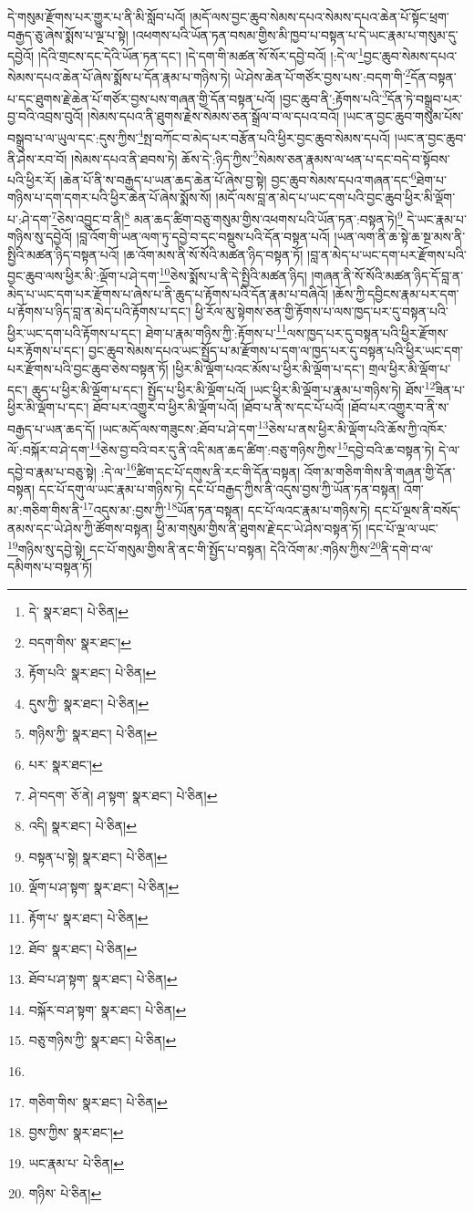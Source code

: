 དེ་གསུམ་རྫོགས་པར་གྱུར་པ་ནི་མི་སློབ་པའོ། །མདོ་ལས་བྱང་ཆུབ་སེམས་དཔའ་སེམས་དཔའ་ཆེན་པོ་སྟོང་ཕྲག་བརྒྱད་ཅུ་ཞེས་སྨོས་པ་ལྔ་པ་སྟེ། །འཕགས་པའི་ཡོན་ཏན་བསམ་གྱིས་མི་ཁྱབ་པ་བསྟན་པ་དེ་ཡང་རྣམ་པ་གསུམ་དུ་དབྱེའོ། །དེའི་གྲངས་དང་དེའི་ཡོན་ཏན་དང་། །དེ་དག་གི་མཚན་སོ་སོར་དབྱེ་བའོ། །:དེ་ལ་\footnote{དེ་  སྣར་ཐང་།  པེ་ཅིན། }བྱང་ཆུབ་སེམས་དཔའ་སེམས་དཔའ་ཆེན་པོ་ཞེས་སྨོས་པ་དོན་རྣམ་པ་གཉིས་ཏེ། ཡེ་ཤེས་ཆེན་པོ་གཙོར་བྱས་པས་:བདག་གི་\footnote{བདག་གིས་  སྣར་ཐང་། }དོན་བསྟན་པ་དང་ཐུགས་རྗེ་ཆེན་པོ་གཙོར་བྱས་པས་གཞན་གྱི་དོན་བསྟན་པའོ། །བྱང་ཆུབ་ནི་:རྟོགས་པའི་\footnote{རྟོག་པའི་  སྣར་ཐང་།  པེ་ཅིན། }དོན་ཏེ་བསྒྲུབ་པར་བྱ་བའི་འབྲས་བུའོ། །སེམས་དཔའ་ནི་ཐུགས་རྗེས་སེམས་ཅན་སྒྲོལ་བ་ལ་དཔའ་བའོ། །ཡང་ན་བྱང་ཆུབ་གསུམ་པོས་བསྒྲུབ་པ་ལ་ཡུལ་དང་:དུས་ཀྱིས་\footnote{དུས་ཀྱི་  སྣར་ཐང་།  པེ་ཅིན། }སྤ་བཀོང་བ་མེད་པར་བརྩོན་པའི་ཕྱིར་བྱང་ཆུབ་སེམས་དཔའོ། །ཡང་ན་བྱང་ཆུབ་ནི་ཤེས་རབ་བོ། །སེམས་དཔའ་ནི་ཐབས་ཏེ། ཆོས་དེ་:ཉིད་ཀྱིས་\footnote{གཉིས་ཀྱི་  སྣར་ཐང་།  པེ་ཅིན། }སེམས་ཅན་རྣམས་ལ་ཕན་པ་དང་བདེ་བ་སྟོབས་པའི་ཕྱིར་རོ། །ཆེན་པོ་ནི་ས་བརྒྱད་པ་ཡན་ཆད་ཆེན་པོ་ཞེས་བྱ་སྟེ། བྱང་ཆུབ་སེམས་དཔའ་གཞན་དང་\footnote{པར་  སྣར་ཐང་། }ཐེག་པ་གཉིས་པ་དག་དགར་པའི་ཕྱིར་ཆེན་པོ་ཞེས་སྨོས་སོ། །མདོ་ལས་བླ་ན་མེད་པ་ཡང་དག་པའི་བྱང་ཆུབ་ཕྱིར་མི་ལྡོག་པ་:ཤེ་དག་\footnote{ཤེ་བདག་  ཅོ་ནེ། ཤ་སྟག་  སྣར་ཐང་།  པེ་ཅིན། }ཅེས་འབྱུང་བ་ནི།\footnote{འདི།  སྣར་ཐང་།  པེ་ཅིན། } མན་ཆད་ཚིག་བཅུ་གསུམ་གྱིས་འཕགས་པའི་ཡོན་ཏན་:བསྟན་ཏེ།\footnote{བསྟན་པ་སྟེ།  སྣར་ཐང་།  པེ་ཅིན། } དེ་ཡང་རྣམ་པ་གཉིས་སུ་དབྱེའོ། །བླ་འོག་གི་ཡན་ལག་ཏུ་དབྱེ་བ་དང་བསྡུས་པའི་དོན་བསྟན་པའོ། །ཡན་ལག་ནི་ཆ་སྟེ་ཆ་སྔ་མས་ནི་སྤྱིའི་མཚན་ཉིད་བསྟན་པའོ། །ཆ་འོག་མས་ནི་སོ་སོའི་མཚན་ཉིད་བསྟན་ཏོ། །བླ་ན་མེད་པ་ཡང་དག་པར་རྫོགས་པའི་བྱང་ཆུབ་ལས་ཕྱིར་མི་:ལྡོག་པ་ཤེ་དག་\footnote{ལྡོག་པ་ཤ་སྟག་  སྣར་ཐང་།  པེ་ཅིན། }ཅེས་སྨོས་པ་ནི་དེ་སྤྱིའི་མཚན་ཉིད། །གཞན་ནི་སོ་སོའི་མཚན་ཉིད་དོ་བླ་ན་མེད་པ་ཡང་དག་པར་རྫོགས་པ་ཞེས་པ་ནི་ཆུད་པ་རྟོགས་པའི་དོན་རྣམ་པ་བཞིའོ། །ཆོས་ཀྱི་དབྱིངས་རྣམ་པར་དག་པ་རྟོགས་པ་ཉིད་བླ་ན་མེད་པའི་རྟོགས་པ་དང་། ཕྱི་རོལ་མུ་སྟེགས་ཅན་གྱི་རྟོགས་པ་ལས་ཁྱད་པར་དུ་བསྟན་པའི་ཕྱིར་ཡང་དག་པའི་རྟོགས་པ་དང་། ཐེག་པ་རྣམ་གཉིས་ཀྱི་:རྟོགས་པ་\footnote{རྟོག་པ་  སྣར་ཐང་།  པེ་ཅིན། }ལས་ཁྱད་པར་དུ་བསྟན་པའི་ཕྱིར་རྫོགས་པར་རྟོགས་པ་དང་། བྱང་ཆུབ་སེམས་དཔའ་ཡང་སྤྱོད་པ་མ་རྫོགས་པ་དག་ལ་ཁྱད་པར་དུ་བསྟན་པའི་ཕྱིར་ཡང་དག་པར་རྫོགས་པའི་བྱང་ཆུབ་ཅེས་བསྟན་ཏོ། །ཕྱིར་མི་ལྡོག་པའང་མོས་པ་ཕྱིར་མི་ལྡོག་པ་དང་། གྲལ་ཕྱིར་མི་ལྡོག་པ་དང་། ཆུད་པ་ཕྱིར་མི་ལྡོག་པ་དང་། སྤྱོད་པ་ཕྱིར་མི་ལྡོག་པའོ། །ཡང་ཕྱིར་མི་ལྡོག་པ་རྣམ་པ་གཉིས་ཏེ། ཐོས་\footnote{ཐོབ་  སྣར་ཐང་།  པེ་ཅིན། }ཟིན་པ་ཕྱིར་མི་ལྡོག་པ་དང་། ཐོབ་པར་འགྱུར་བ་ཕྱིར་མི་ལྡོག་པའོ། །ཐོབ་པ་ནི་ས་དང་པོ་པའོ། །ཐོབ་པར་འགྱུར་བ་ནི་ས་བརྒྱད་པ་ཡན་ཆད་དོ། །ཡང་མདོ་ལས་གཟུངས་:ཐོབ་པ་ཤེ་དག་\footnote{ཐོབ་པ་ཤ་སྟག་  སྣར་ཐང་།  པེ་ཅིན། }ཅེས་པ་ནས་ཕྱིར་མི་ལྡོག་པའི་ཆོས་ཀྱི་འཁོར་ལོ་:བསྐོར་བ་ཤེ་དག་\footnote{བསྐོར་བ་ཤ་སྟག་  སྣར་ཐང་།  པེ་ཅིན། }ཅེས་བྱ་བའི་བར་དུ་ནི་འདི་མན་ཆད་ཚིག་:བཅུ་གཉིས་ཀྱིས་\footnote{བཅུ་གཉིས་ཀྱི་  སྣར་ཐང་།  པེ་ཅིན། }དབྱེ་བའི་ཆ་བསྟན་ཏེ། དེ་ལ་དབྱེ་བ་རྣམ་པ་བཅུ་སྟེ། :དེ་ལ་\footnote{}ཚིག་དང་པོ་དགུས་ནི་རང་གི་དོན་བསྟན། འོག་མ་གཅིག་གིས་ནི་གཞན་གྱི་དོན་བསྟན། དང་པོ་དགུ་ལ་ཡང་རྣམ་པ་གཉིས་ཏེ། དང་པོ་བརྒྱད་ཀྱིས་ནི་འདུས་བྱས་ཀྱི་ཡོན་ཏན་བསྟན། འོག་མ་:གཅིག་གིས་ནི་\footnote{གཅིག་གིས་  སྣར་ཐང་།  པེ་ཅིན། }འདུས་མ་:བྱས་ཀྱི་\footnote{བྱས་ཀྱིས་  སྣར་ཐང་། }ཡོན་ཏན་བསྟན། དང་པོ་ལའང་རྣམ་པ་གཉིས་ཏེ། དང་པོ་ལྔས་ནི་བསོད་ནམས་དང་ཡེ་ཤེས་ཀྱི་ཚོགས་བསྟན། ཕྱི་མ་གསུམ་གྱིས་ནི་ཐུགས་རྗེ་དང་ཡེ་ཤེས་བསྟན་ཏོ། །དང་པོ་ལྔ་ལ་ཡང་\footnote{ཡང་རྣམ་པ་  པེ་ཅིན། }གཉིས་སུ་དབྱེ་སྟེ། དང་པོ་གསུམ་གྱིས་ནི་ནང་གི་སྤྱོད་པ་བསྟན། དེའི་འོག་མ་:གཉིས་ཀྱིས་\footnote{གཉིས་  པེ་ཅིན། }ནི་དགེ་བ་ལ་དམིགས་པ་བསྟན་ཏོ། 